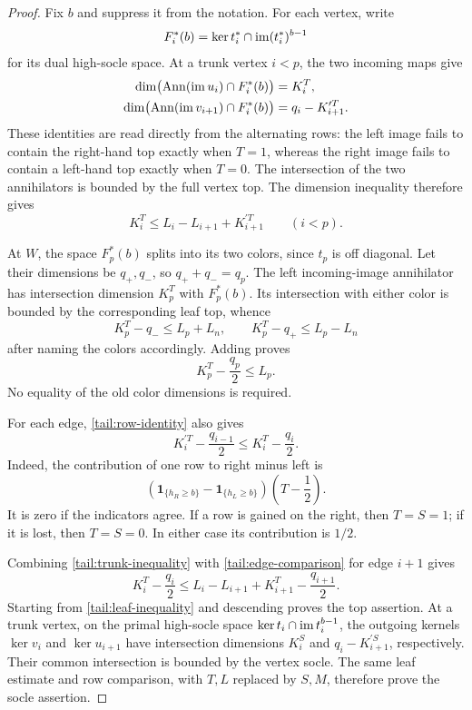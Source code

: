 \begin{proof}
Fix \(b\) and suppress it from the notation. For each vertex, write
\[
 F_i^*(b)=\ker t_i^*\cap\operatorname{im}(t_i^*)^{b-1}
\]
for its dual high-socle space. At a trunk vertex \(i<p\), the two
incoming maps give
\[
 \begin{aligned}
 \dim\bigl(\operatorname{Ann}(\operatorname{im} u_i)\cap F_i^*(b)\bigr)
   &=K_i^T,\\
 \dim\bigl(\operatorname{Ann}(\operatorname{im} v_{i+1})\cap F_i^*(b)\bigr)
   &=q_i-K_{i+1}^{\prime T}.
 \end{aligned}
\]
These identities are read directly from the alternating rows:
the left image fails to contain the right-hand top exactly when
\(T=1\), whereas the right image fails to contain a left-hand top
exactly when \(T=0\).
The intersection of the two annihilators is bounded by the full
vertex top.  The dimension inequality therefore gives
\begin{equation}\label{tail:trunk-inequality}
 K_i^T\le L_i-L_{i+1}+K_{i+1}^{\prime T}\qquad(i<p).
\end{equation}

At \(W\), the space \(F_p^*(b)\) splits into its two colors, since
\(t_p\) is off diagonal.  Let their dimensions be \(q_+,q_-\),
so \(q_++q_-=q_p\).  The left incoming-image annihilator has
intersection dimension \(K_p^T\) with \(F_p^*(b)\).  Its intersection
with either color is bounded by the corresponding leaf top, whence
\[
 K_p^T-q_-\le L_p+L_n,\qquad
 K_p^T-q_+\le L_p-L_n
\]
after naming the colors accordingly.  Adding proves
\begin{equation}\label{tail:leaf-inequality}
 K_p^T-\frac{q_p}{2}\le L_p.
\end{equation}
No equality of the old color dimensions is required.

For each edge, \eqref{tail:row-identity} also gives
\begin{equation}\label{tail:edge-comparison}
 K_i^{\prime T}-\frac{q_{i-1}}2
 \le K_i^T-\frac{q_i}2 .
\end{equation}
Indeed, the contribution of one row to right minus left is
\[
 \left(\mathbf1_{\{h_R\ge b\}}-\mathbf1_{\{h_L\ge b\}}\right)
 \left(T-\frac12\right).
\]
It is zero if the indicators agree.  If a row is gained on the
right, then \(T=S=1\); if it is lost, then \(T=S=0\).
In either case its contribution is \(1/2\).

Combining \eqref{tail:trunk-inequality} with
\eqref{tail:edge-comparison} for edge \(i+1\) gives
\[
 K_i^T-\frac{q_i}2
 \le L_i-L_{i+1}+K_{i+1}^T-\frac{q_{i+1}}2 .
\]
Starting from \eqref{tail:leaf-inequality} and descending proves the
top assertion. At a trunk vertex, on the primal high-socle space
\(\ker t_i\cap\operatorname{im} t_i^{b-1}\), the outgoing kernels
\(\ker v_i\) and \(\ker u_{i+1}\) have intersection dimensions
\(K_i^S\) and \(q_i-K_{i+1}^{\prime S}\), respectively.
Their common intersection is bounded by the vertex socle. The same
leaf estimate and row comparison, with \(T,L\) replaced by \(S,M\),
therefore prove the socle assertion.
\end{proof}

